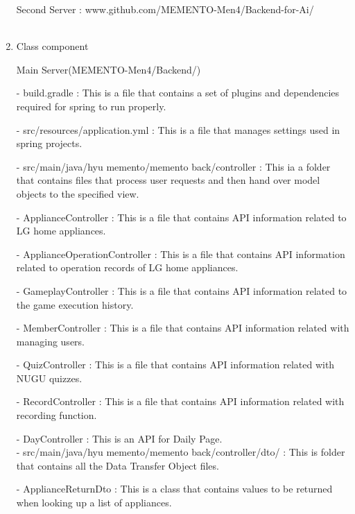 \documentclass[conference]{IEEEtran}
\begin{document}
\begin{enumerate}
    Second Server : www.github.com/MEMENTO-Men4/Backend-for-Ai/ \\ \\
    \item Class component
    \item[] Main Server(MEMENTO-Men4/Backend/)\\
        \item[-] build.gradle : This is a file that contains a set of plugins and dependencies required for spring to run properly.\\
        \item[-] src/resources/application.yml : This is a file that manages settings used in spring projects.\\
        \item[-] src/main/java/hyu memento/memento back/controller : This ia a folder that contains files that process user requests and then hand over model objects to the specified view.\\
        \item [-] ApplianceController : This is a file that contains API information related to LG home appliances.\\
        \item [-] ApplianceOperationController : This is a file that contains API information related to operation records of LG home appliances.\\
        \item [-] GameplayController : This is a file that contains API information related to the game execution history.\\
        \item[-] MemberController : This is a file that contains API information related with managing users.\\
        \item [-] QuizController : This is a file that contains API information related with NUGU quizzes.\\
        \item [-] RecordController : This is a file that contains API information related with recording function.\\
        \item [-] DayController : This is an API for Daily Page.\\
        - src/main/java/hyu memento/memento back/controller/dto/ : This is folder that contains all the Data Transfer Object files.
        \item [-]ApplianceReturnDto : This is a class that contains values to be returned when looking up a list of appliances.\\

\end{enumerate}
\end{document}
